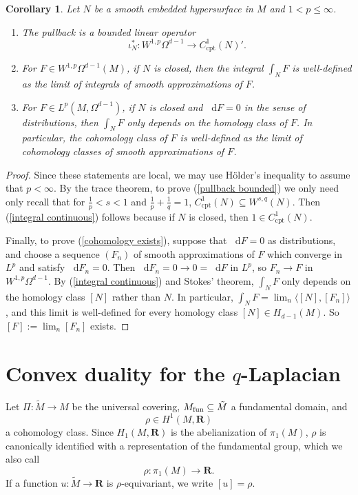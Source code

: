 \documentclass[reqno,11pt]{amsart}
\newcommand{\RR}{\mathbf{R}}
\newcommand*\dif{\mathop{}\!\mathrm{d}}
\newcommand{\cpt}{\mathrm{cpt}}
\newtheorem{corollary}[theorem]{Corollary}
\theoremstyle{definition}
\numberwithin{equation}{section}
\begin{document}
\begin{corollary}\label{trace on cycles}
Let $N$ be a smooth embedded hypersurface in $M$ and $1 < p \leq \infty$.
\begin{enumerate}
\item \label{pullback bounded} The pullback is a bounded linear operator
$$\iota^*_N: W^{1, p} \Omega^{d - 1} \to C^1_\cpt(N)'.$$
\item \label{integral continuous} For $F \in W^{1, p} \Omega^{d - 1}(M)$, if $N$ is closed, then the integral $\int_N F$ is well-defined as the limit of integrals of smooth approximations of $F$.
\item \label{cohomology exists} For $F \in L^p(M, \Omega^{d - 1})$, if $N$ is closed and $\dif F = 0$ in the sense of distributions, then $\int_N F$ only depends on the homology class of $F$. In particular, the cohomology class of $F$ is well-defined as the limit of cohomology classes of smooth approximations of $F$.
\end{enumerate}
\end{corollary}
\begin{proof}
Since these statements are local, we may use H\"older's inequality to assume that $p < \infty$.
By the trace theorem, to prove (\ref{pullback bounded}) we only need only recall that for $\frac{1}{p} < s < 1$ and $\frac{1}{p} + \frac{1}{q} = 1$, $C^1_\cpt(N) \subseteq W^{s, q}(N)$.
Then (\ref{integral continuous}) follows because if $N$ is closed, then $1 \in C^1_\cpt(N)$.

Finally, to prove (\ref{cohomology exists}), suppose that $\dif F = 0$ as distributions, and choose a sequence $(F_n)$ of smooth approximations of $F$ which converge in $L^p$ and satisfy $\dif F_n = 0$.
Then $\dif F_n = 0 \to 0 = \dif F$ in $L^p$, so $F_n \to F$ in $W^{1, p} \Omega^{d - 1}$.
By (\ref{integral continuous}) and Stokes' theorem, $\int_N F$ only depends on the homology class $[N]$ rather than $N$.
In particular, $\int_N F = \lim_n \langle [N], [F_n]\rangle$, and this limit is well-defined for every homology class $[N] \in H_{d - 1}(M)$.
So $[F] := \lim_n [F_n]$ exists.
\end{proof}

\section{Convex duality for the $q$-Laplacian}
Let $\Pi: \tilde M \to M$ be the universal covering, $M_{\rm fun} \subseteq \tilde M$ a fundamental domain, and
$$\rho \in H^1(M, \RR)$$
a cohomology class.
Since $H_1(M, \RR)$ is the abelianization of $\pi_1(M)$, $\rho$ is canonically identified with a representation of the fundamental group, which we also call
$$\rho: \pi_1(M) \to \RR.$$
If a function $u: \tilde M \to \RR$ is $\rho$-equivariant, we write $[u] = \rho$.
\end{document}
